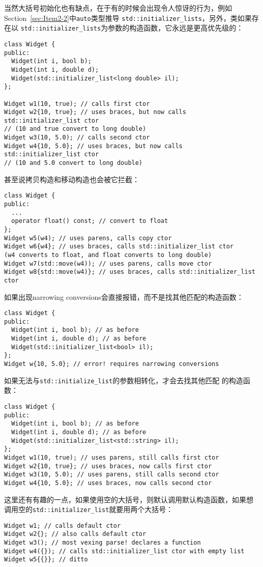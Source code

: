 当然大括号初始化也有缺点，在于有的时候会出现令人惊讶的行为，例如
Section~\ref{sec:Item2-2}中\texttt{auto}类型推导
\texttt{std::initializer\_lists}，另外，类如果存在以
\texttt{std::initializer\_lists}为参数的构造函数，它永远是更高优先级的：

\begin{verbatim}
class Widget {
public:
  Widget(int i, bool b);
  Widget(int i, double d); 
  Widget(std::initializer_list<long double> il);
};

Widget w1(10, true); // calls first ctor
Widget w2{10, true}; // uses braces, but now calls std::initializer_list ctor
// (10 and true convert to long double)
Widget w3(10, 5.0); // calls second ctor
Widget w4{10, 5.0}; // uses braces, but now calls
std::initializer_list ctor
// (10 and 5.0 convert to long double)
\end{verbatim}

甚至说拷贝构造和移动构造也会被它拦截：
\begin{verbatim}
class Widget {
public:
  ...
  operator float() const; // convert to float
};
Widget w5(w4); // uses parens, calls copy ctor
Widget w6{w4}; // uses braces, calls std::initializer_list ctor
(w4 converts to float, and float converts to long double)
Widget w7(std::move(w4)); // uses parens, calls move ctor
Widget w8{std::move(w4)}; // uses braces, calls std::initializer_list ctor
\end{verbatim}

如果出现narrowing conversions会直接报错，而不是找其他匹配的构造函数：
\begin{verbatim}
class Widget {
public:
  Widget(int i, bool b); // as before
  Widget(int i, double d); // as before
  Widget(std::initializer_list<bool> il);
}; 
Widget w{10, 5.0}; // error! requires narrowing conversions
\end{verbatim}

如果无法与\texttt{std::initialize\_list}的参数相转化，才会去找其他匹配
的构造函数：
\begin{verbatim}
class Widget {
public:
  Widget(int i, bool b); // as before
  Widget(int i, double d); // as before
  Widget(std::initializer_list<std::string> il);
}; 
Widget w1(10, true); // uses parens, still calls first ctor
Widget w2{10, true}; // uses braces, now calls first ctor
Widget w3(10, 5.0); // uses parens, still calls second ctor
Widget w4{10, 5.0}; // uses braces, now calls second ctor
\end{verbatim}

这里还有有趣的一点，如果使用空的大括号，则默认调用默认构造函数，如果想
调用空的\texttt{std::initializer\_list}就要用两个大括号：
\begin{verbatim}
Widget w1; // calls default ctor
Widget w2{}; // also calls default ctor
Widget w3(); // most vexing parse! declares a function
Widget w4({}); // calls std::initializer_list ctor with empty list
Widget w5{{}}; // ditto
\end{verbatim}

